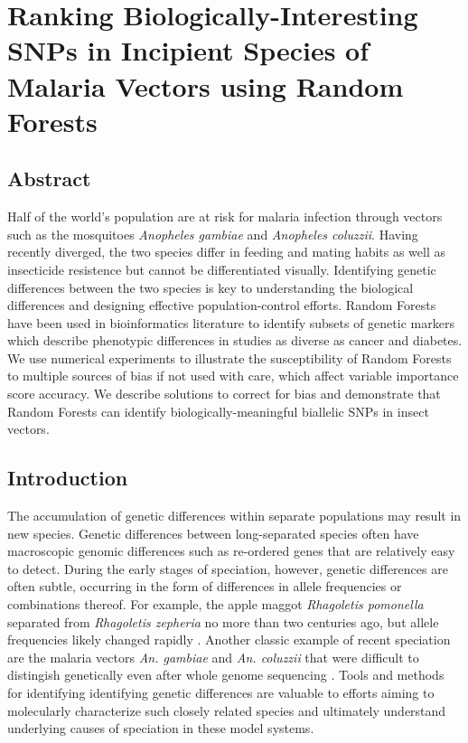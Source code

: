 \chapter{Ranking Biologically-Interesting SNPs in Incipient Species of Malaria Vectors using Random Forests}

\section{Abstract}
  Half of the world's population are at risk for malaria infection through vectors such as the mosquitoes \emph{Anopheles gambiae} and \emph{Anopheles coluzzii}.  Having recently diverged, the two species differ in feeding and mating habits as well as insecticide resistence but cannot be differentiated visually. Identifying genetic differences between the two species is key to understanding the biological differences and designing effective population-control efforts.
  Random Forests have been used in bioinformatics literature to identify subsets of genetic markers which describe phenotypic differences in studies as diverse as cancer and diabetes. 
  We use numerical experiments to illustrate the susceptibility of Random Forests to multiple sources of bias if not used with care, which affect variable importance score accuracy.
  We describe solutions to correct for bias and demonstrate that Random Forests can identify biologically-meaningful biallelic SNPs in insect vectors.

\section{Introduction}
The accumulation of genetic differences within separate populations may result in new species. Genetic differences between long-separated species often have macroscopic genomic differences such as re-ordered genes that are relatively easy to detect. During the early stages of speciation, however, genetic differences are often subtle, occurring in the form of differences in allele frequencies or combinations thereof. For example, the apple maggot \emph{Rhagoletis pomonella} separated from \emph{Rhagoletis zepheria} no more than two centuries ago, but allele frequencies likely changed rapidly \cite{Egan2015}.  Another classic example of recent speciation are the malaria vectors \emph{An. gambiae} and \emph{An. coluzzii} that were difficult to distingish genetically even after whole genome sequencing \cite{Lawniczak2010}. Tools and methods for identifying identifying genetic differences are valuable to efforts aiming to molecularly characterize such closely related species and ultimately understand underlying causes of speciation in these model systems.


